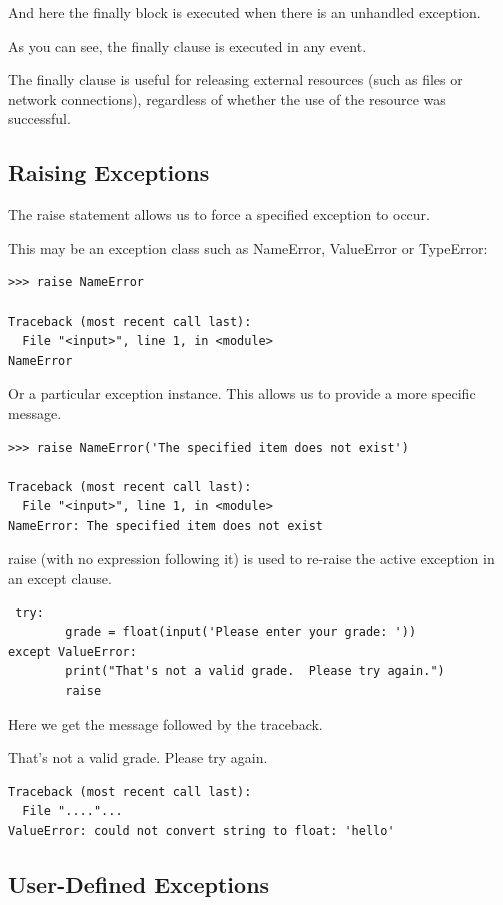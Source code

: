 \documentclass{article}
\begin{document}
And here the finally block is executed when there is an unhandled exception.

As you can see, the finally clause is executed in any event. 

The finally clause is useful for releasing external resources (such as files or network connections), regardless of whether the use of the resource was successful.

\subsection{Raising Exceptions}

The raise statement allows us to force a specified exception to occur. 

This may be an exception class such as NameError, ValueError or TypeError:

\begin{lstlisting}
>>> raise NameError

Traceback (most recent call last):
  File "<input>", line 1, in <module>
NameError
\end{lstlisting}

Or a particular exception instance.  This allows us to provide a more specific message.

\begin{lstlisting}
>>> raise NameError('The specified item does not exist') 

Traceback (most recent call last):
  File "<input>", line 1, in <module>
NameError: The specified item does not exist
\end{lstlisting}

raise (with no expression following it) is used to re-raise the active exception in an except clause.

\begin{lstlisting}
 try:
        grade = float(input('Please enter your grade: '))
except ValueError:
        print("That's not a valid grade.  Please try again.")
        raise
\end{lstlisting}

Here we get the message followed by the traceback.

That's not a valid grade.  Please try again.
\begin{lstlisting}
Traceback (most recent call last):
  File "...."...
ValueError: could not convert string to float: 'hello'
\end{lstlisting}

\subsection{User-Defined Exceptions}
\end{document}
